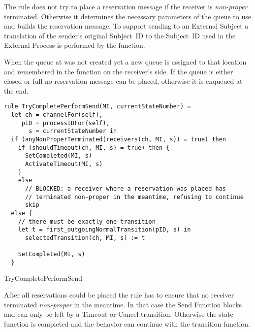 The  rule does not try to place a reservation message
if the receiver is \textit{non-proper} terminated. Otherwise it determines
the necessary parameters of the queue to use and builds the reservation message.
To support sending to an External Subject a translation of the sender's original
Subject~ID to the Subject~ID used in the External Process is performed by the
 function.

When the queue at  was not
created yet a new queue is assigned to that location and remembered in the
 function on the receiver's side.
If the queue is either closed or full no reservation message can be placed,
otherwise it is enqueued at the end.



\begin{listing}[H]
\begin{verbatim}
rule TryCompletePerformSend(MI, currentStateNumber) =
  let ch = channelFor(self),
     pID = processIDFor(self),
       s = currentStateNumber in
  if (anyNonProperTerminated(receivers(ch, MI, s)) = true) then
    if (shouldTimeout(ch, MI, s) = true) then {
      SetCompleted(MI, s)
      ActivateTimeout(MI, s)
    }
    else
      // BLOCKED: a receiver where a reservation was placed has
      // terminated non-proper in the meantime, refusing to continue
      skip
  else {
    // there must be exactly one transition
    let t = first_outgoingNormalTransition(pID, s) in
      selectedTransition(ch, MI, s) := t

    SetCompleted(MI, s)
  }
\end{verbatim}
\caption{TryCompletePerformSend}
\label{lst:shortasm:TryCompletePerformSend}
\end{listing}


After all reservations could be placed the 
rule has to ensure that no receiver terminated \textit{non-proper} in the
meantime. In that case the Send Function blocks and can only be left by a
Timeout or Cancel transition. Otherwise the state function is completed and the behavior can
continue with the transition function.


